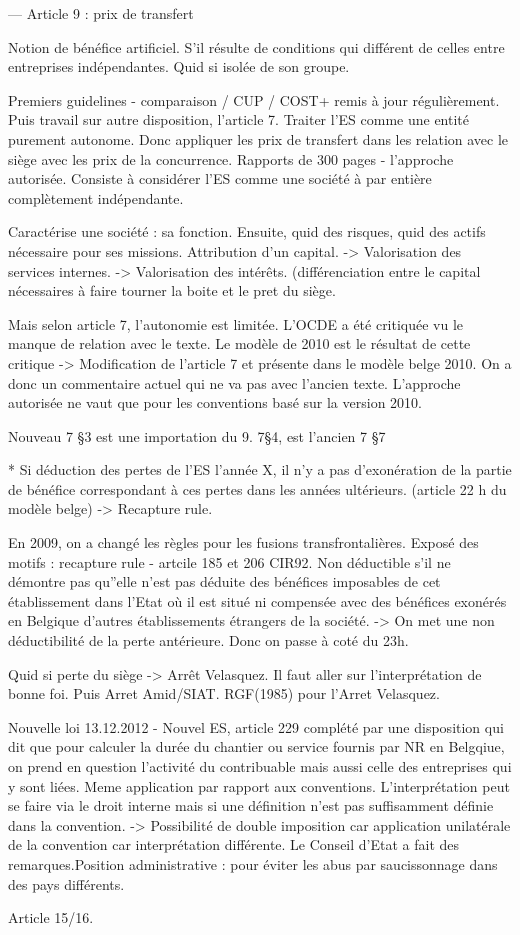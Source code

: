 \documentclass{book}
\begin{document}
---
Article 9 : prix de transfert

Notion de bénéfice artificiel. S'il résulte de conditions qui différent de celles entre entreprises indépendantes. Quid si isolée de son groupe.

Premiers guidelines - comparaison / CUP / COST+ remis à jour régulièrement. Puis travail sur autre disposition, l'article 7. Traiter l'ES comme une entité purement autonome. Donc appliquer les prix de transfert dans les relation avec le siège avec les prix de la concurrence. Rapports de 300 pages - l'approche autorisée. Consiste à considérer l'ES comme une société à par entière complètement indépendante.

Caractérise une société : sa fonction. Ensuite, quid des risques, quid des actifs nécessaire pour ses missions. Attribution d'un capital.
-> Valorisation des services internes.
-> Valorisation des intérêts. (différenciation entre le capital nécessaires à faire tourner la boite et le pret du siège.

Mais selon article 7, l'autonomie est limitée. L'OCDE a été critiquée vu le manque de relation avec le texte. Le modèle de 2010 est le résultat de cette critique -> Modification de l'article 7 et présente dans le modèle belge 2010. On a donc un commentaire actuel qui ne va pas avec l'ancien texte. L'approche autorisée ne vaut que pour les conventions basé sur la version 2010.

Nouveau 7 §3 est une importation du 9. 7§4, est l'ancien 7 §7


* Si déduction des pertes de l'ES l'année X, il n'y a pas d'exonération de la partie de bénéfice correspondant à ces pertes dans les années ultérieurs. (article 22 h du modèle belge) -> Recapture rule.

En 2009, on a changé les règles pour les fusions transfrontalières. Exposé des motifs : recapture rule - artcile 185 et 206 CIR92. Non déductible s'il ne démontre pas qu''elle n'est pas déduite des bénéfices imposables de cet établissement dans l'Etat où il est situé ni compensée avec des bénéfices exonérés en Belgique d'autres établissements étrangers de la société. -> On met une non déductibilité de la perte antérieure. Donc on passe à coté du 23h.


Quid si perte du siège -> Arrêt Velasquez. Il faut aller sur l'interprétation de bonne foi. Puis Arret Amid/SIAT. RGF(1985) pour l'Arret Velasquez.

Nouvelle loi 13.12.2012 - Nouvel ES, article 229 complété par une disposition qui dit que pour calculer la durée du chantier ou service fournis par NR en Belgqiue, on prend en question l'activité du contribuable mais aussi celle des entreprises qui y sont liées. Meme application par rapport aux conventions. L'interprétation peut se faire via le droit interne mais si une définition n'est pas suffisamment définie dans la convention. -> Possibilité de double imposition car application unilatérale de la convention car interprétation différente. Le Conseil d'Etat a fait des remarques.Position administrative : pour éviter les abus par saucissonnage dans des pays différents.

Article 15/16.





\nocite{*}

\end{document}
